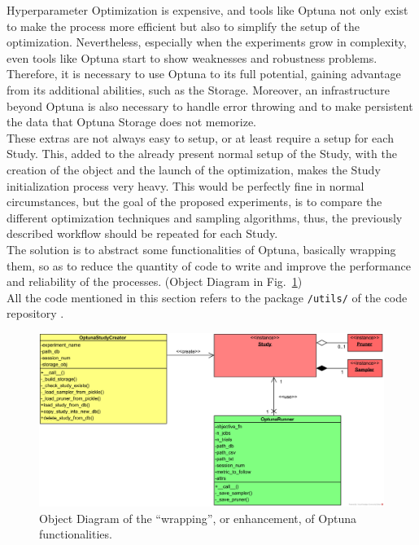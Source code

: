 Hyperparameter Optimization is expensive, and tools like Optuna not only exist to make the process more efficient but also to simplify the setup of the optimization.
Nevertheless, especially when the experiments grow in complexity, even tools like Optuna start to show weaknesses and robustness problems.
\\[0.3cm]Therefore, it is necessary to use Optuna to its full potential, gaining advantage from its additional abilities, such as the Storage. Moreover, an infrastructure beyond Optuna is also necessary to handle error throwing and to make persistent the data that Optuna Storage does not memorize.
\\[0.3cm]These extras are not always easy to setup, or at least require a setup for each Study. This, added to the already present normal setup of the Study, with the creation of the object and the launch of the optimization, makes the Study initialization process very heavy.
This would be perfectly fine in normal circumstances, but the goal of the proposed experiments, is to compare the different optimization techniques and sampling algorithms, thus, the previously described workflow should be repeated for each Study.
\\[0.3cm]The solution is to abstract some functionalities of Optuna, basically wrapping them, so as to reduce the quantity of code to write and improve the performance and reliability of the processes. (Object Diagram in Fig.~\ref{fig:figure-3.3.1})
\\[0.3cm]All the code mentioned in this section refers to the package \texttt{/utils/} of the code repository \cite{Repository-THESIS}.
\begin{figure}[t]
	\centering
	\includegraphics[width=15cm]{figures/figure-3.3.1.png}
	\caption[Object Diagram of Optuna Wrapping]{Object Diagram of the “wrapping”, or enhancement, of Optuna functionalities.}
	\label{fig:figure-3.3.1}
\end{figure}

